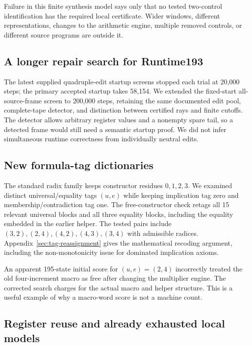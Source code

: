 \documentclass[11pt]{article}
\theoremstyle{definition}\newtheorem{definition}[theorem]{Definition}
\begin{document}


Failure in this finite synthesis model says only that no tested two-control
identification has the required local certificate. Wider windows, different
representations, changes to the arithmetic engine, multiple removed
controls, or different source programs are outside it.

\subsection{A longer repair search for Runtime193}

The latest supplied quadruple-edit startup screens stopped each trial at
20,000 steps; the primary accepted startup takes 58,154. We extended the
fixed-start all-source-frame screen to 200,000 steps, retaining the same
documented edit pool, complete-tape detector, and distinction between
certified rays and finite cutoffs. The detector allows arbitrary register
values and a nonempty spare tail, so a detected frame would still need a
semantic startup proof. We did not infer simultaneous runtime correctness
from individually neutral edits.



\subsection{New formula-tag dictionaries}

The standard radix family keeps constructor residues $0,1,2,3$. We
examined distinct universal/equality tags $(u,e)$ while keeping implication
tag zero and membership/contradiction tag one. The free-constructor check
retags all 15 relevant universal blocks and all three equality blocks,
including the equality embedded in the earlier helper. The tested pairs
include $(3,2),(2,4),(4,2),(4,3),(3,4)$ with admissible radices.
Appendix~\ref{sec:tag-reassignment} gives the mathematical recoding argument,
including the non-monotonicity issue for dominated implication axioms.

An apparent 195-state initial score for $(u,e)=(2,4)$ incorrectly treated
the old four-increment macro as free after changing the multiplier engine.
The corrected search charges for the actual macro and helper structure.
This is a useful example of why a macro-word score is not a machine count.


\subsection{Register reuse and already exhausted local models}
\end{document}
